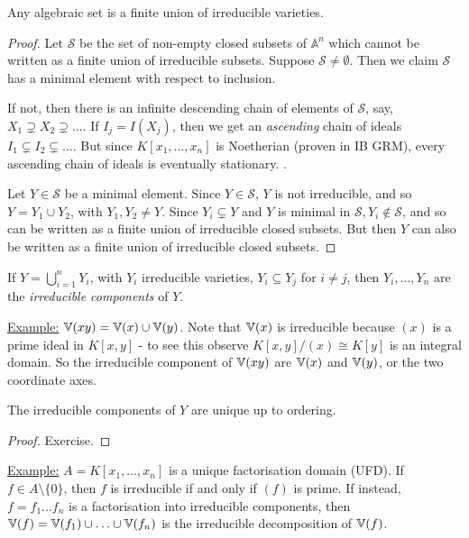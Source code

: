 \documentclass[10pt,a4paper,rgb]{article}
\begin{document}
\begin{proposition}
Any algebraic set is a finite union of irreducible varieties.
\end{proposition}
\begin{proof}
Let $\mathcal{S}$ be the set of non-empty closed subsets of $\mathbb{A}^n$ which cannot be written as a finite union of irreducible subsets. Suppose $\mathcal{S} \neq \emptyset$. Then we claim $\mathcal{S}$ has a minimal element with respect to inclusion. 

If not, then there is an infinite descending chain of elements of $\mathcal{S}$, say, $X_1 \supsetneq X_2 \supsetneq \ldots$. If $I_j = I(X_j)$, then we get an \textit{ascending} chain of ideals $I_1 \subsetneq I_2 \subsetneq \ldots$. But since $K[x_1, \ldots, x_n]$ is Noetherian (proven in IB GRM), every ascending chain of ideals is eventually stationary. \contr.

Let $Y \in \mathcal{S}$ be a minimal element. Since $Y \in \mathcal{S}$, $Y$ is not irreducible, and so $Y = Y_1 \cup Y_2$, with $Y_1, Y_2 \neq Y$. Since $Y_i \subsetneq Y$ and $Y$ is minimal in $\mathcal{S}, Y_i \notin \mathcal{S}$, and so can be written as a finite union of irreducible closed subsets. But then $Y$ can also be written as a finite union of irreducible closed subsets.
\end{proof}

If $Y = \bigcup_{i=1}^n Y_i$, with $Y_i$ irreducible varieties, $Y_i \subseteq Y_j$ for $i \neq j$, then $Y_i, \ldots, Y_n$ are the \emph{irreducible components} of $Y$.

\hspace*{-1em}\underline{Example:} $\mathbb{V}(xy) = \mathbb{V}(x)\cup \mathbb{V}(y)$. Note that $\mathbb{V}(x)$ is irreducible because $(x)$ is a prime ideal in $K[x,y]$ - to see this observe $K[x,y]/(x) \cong K[y]$ is an integral domain. So the irreducible component of $\mathbb{V}(xy)$ are $\mathbb{V}(x)$ and $\mathbb{V}(y)$, or the two coordinate axes.

\begin{proposition}
The irreducible components of $Y$ are unique up to ordering.
\end{proposition}
\begin{proof}
Exercise.
\end{proof}

\hspace*{-1em}\underline{Example:} $A = K[x_1, \ldots, x_n]$ is a unique factorisation domain (UFD). If $f \in A\setminus\{0\}$, then $f$ is irreducible if and only if $(f)$ is prime. If instead, $f = f_1\ldots f_n$ is a factorisation into irreducible components, then $\mathbb{V}(f) = \mathbb{V}(f_1)\cup\ldots\cup \mathbb{V}(f_n)$ is the irreducible decomposition  of $\mathbb{V}(f)$.
\end{document}
